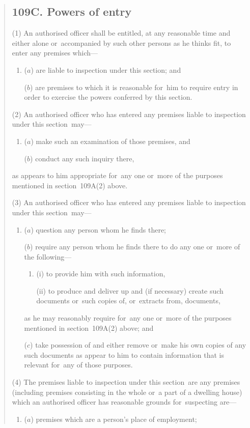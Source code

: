 \documentclass[12pt,a4paper]{article}
\begin{document}
\begin{quotation}
\subsection*{109C. Powers of entry}

(1) An authorised officer shall be entitled, at any reasonable time and either alone or~accompanied by such other persons as he thinks fit, to enter any premises which—
\begin{enumerate}\item[]
($a$) are liable to inspection under this section; and

($b$) are premises to which it is reasonable for~him to require entry in order to exercise the powers conferred by this section.
\end{enumerate}

(2) An authorised officer who has entered any premises liable to inspection under this section~may—
\begin{enumerate}\item[]
($a$) make such an examination of those premises, and

($b$) conduct any such inquiry there,
\end{enumerate}
as appears to him appropriate for~any one or~more of the purposes mentioned in section~109A(2)  above.

(3) An authorised officer who has entered any premises liable to inspection under this section~may—
\begin{enumerate}\item[]
($a$) question any person whom he finds there;

($b$) require any person whom he finds there to do any one or~more of the following—
\begin{enumerate}\item[]
(i) to provide him with such information,

(ii) to produce and deliver up and (if necessary) create such documents or~such copies of, or~extracts from, documents,
\end{enumerate}
as he may reasonably require for~any one or~more of the purposes mentioned in section~109A(2)  above; and

($c$) take possession of and either remove or~make his own copies of any such documents as appear to him to contain information that is relevant for~any of those purposes.
\end{enumerate}

(4) The premises liable to inspection under this section~are any premises (including premises consisting in the whole or~a part of a dwelling house) which an authorised officer has reasonable grounds for~suspecting are—
\begin{enumerate}\item[]
($a$) premises which are a person’s place of employment;


\end{enumerate}
\end{quotation}
\end{document}
